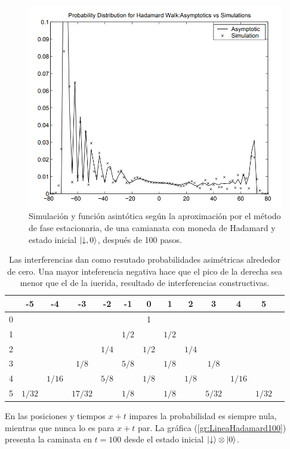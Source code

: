 \begin{figure}[ht]
\centering
\includegraphics[width=1\textwidth]{Kap3/QWonlineNayak.png}
\caption{Simulación y función asintótica según la aproximación por el método de fase estacionaria, de una camianata con moneda de Hadamard y estado inicial $\ket{\downarrow,0}$, después de 100 pasos.}
\label{gr:Hadamard100Simulacion}
\end{figure}


\begin{table}[h]
    \centering
    \begin{tabular}{|c||c|c|c|c|c|c|c|c|c|c|c|c|}
        \hline
         &-5&-4&-3&-2&-1&0&1&2&3&4&5\\\hline\hline
        0&&&&&&1&&&&& \\ \hline
        1&&&&&$1/2$&&$1/2$&&&& \\\hline
        2&&&&$1/4$&&$1/2$&&$1/4$&&& \\ \hline
        3&&&$1/8$&&$5/8$&&$1/8$&&$1/8$&& \\ \hline
        4&&$1/16$&&$5/8$&&$1/8$&&$1/8$&&$1/16$& \\\hline
        5&$1/32$&&$17/32$&&$1/8$&&$1/8$&&$5/32$&&$1/32$ \\
    \hline
    \end{tabular}
    \medskip
    \caption{Las interferencias dan como resutado 
    probabilidades asimétricas alrededor de cero. Una mayor inteferencia negativa hace que el pico de la derecha sea menor que el de la iuerida, resultado de interferencias constructivas.}
    \label{TablaCuantica}
\end{table}
En las posiciones y tiempos $x+t$ impares la probabilidad es siempre nula, mientras que nunca lo es para $x+t$ par. La gráfica (\ref{gr:LineaHadamard100}) presenta la caminata en $t=100$ desde el estado inicial $\ket{\downarrow}\otimes\ket{0}$. 

